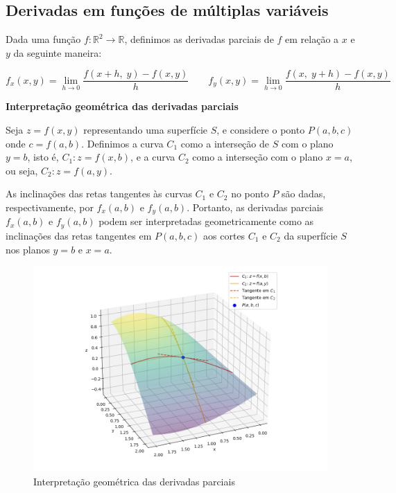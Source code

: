 \subsection{Derivadas em funções de múltiplas variáveis}


\begin{definition} Dada uma função $f: \mathbb{R}^2 \to \mathbb{R}$, definimos as derivadas parciais de $f$ em relação a $x$ e $y$ da seguinte maneira:

\[
f_x(x, y) = \lim_{h \to 0} \dfrac{f(x + h,\; y) - f(x ,y)}{h}
\qquad
f_y(x, y) = \lim_{h \to 0} \dfrac{f(x,\; y + h) - f(x ,y)}{h}
\]

\end{definition}
\textbf{Interpretação geométrica das derivadas parciais}

Seja $z = f(x, y)$ representando uma superfície $S$, e considere o ponto $P(a, b, c)$ onde $c = f(a, b)$. Definimos a curva $C_1$ como a interseção de $S$ com o plano $y = b$, isto é, $C_1: z = f(x, b)$, e a curva $C_2$ como a interseção com o plano $x = a$, ou seja, $C_2: z = f(a, y)$.

As inclinações das retas tangentes às curvas $C_1$ e $C_2$ no ponto $P$ são dadas, respectivamente, por $f_x(a, b)$ e $f_y(a, b)$. Portanto, as derivadas parciais $f_x(a, b)$ e $f_y(a, b)$ podem ser interpretadas geometricamente como as inclinações das retas tangentes em $P(a, b, c)$ aos cortes $C_1$ e $C_2$ da superfície $S$ nos planos $y = b$ e $x = a$.

\begin{figure}[H]
	\centering
	\includegraphics[width=1\linewidth]{pictures/Figure_1.png}
	\caption{Interpretação geométrica das derivadas parciais}
	\label{fig:interpretacao}
\end{figure}

